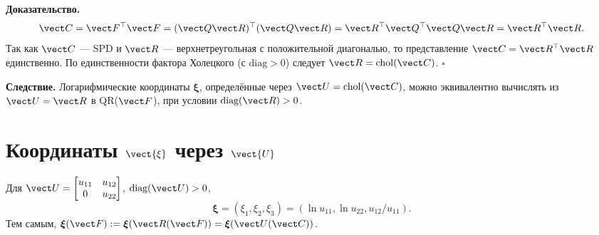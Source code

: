\textbf{Доказательство.}
\begin{equation}
\vect C = \vect F^{\top}\vect F = (\vect Q \vect R)^{\top}(\vect Q \vect R) = \vect R^{\top} \vect Q^{\top} \vect Q \vect R = \vect R^{\top} \vect R.
\end{equation}
Так как $\vect C$ — SPD и $\vect R$ — верхнетреугольная с положительной диагональю, то представление $\vect C = \vect R^{\top}\vect R$ единственно. По единственности фактора Холецкого (с $\text{diag} > 0$) следует $\vect R = \text{chol}(\vect C)$. $\square$

\textbf{Следствие.} Логарифмические координаты $\boldsymbol{\xi}$, определённые через $\vect U = \text{chol}(\vect C)$, можно эквивалентно вычислять из $\vect U = \vect R$ в QR($\vect F$), при условии $\text{diag}(\vect R) > 0$.

\section{Координаты $\vect{\xi}$ через $\vect{U}$}

Для $\vect U = \begin{bmatrix} u_{11} & u_{12} \\ 0 & u_{22} \end{bmatrix}$, $\text{diag}(\vect U) > 0$,
\begin{equation}
\boldsymbol{\xi} = (\xi_1, \xi_2, \xi_3) = (\ln u_{11}, \ln u_{22}, u_{12}/u_{11}).
\end{equation}
Тем самым, $\boldsymbol{\xi}(\vect F) := \boldsymbol{\xi}(\vect R(\vect F)) = \boldsymbol{\xi}(\vect U(\vect C))$.



